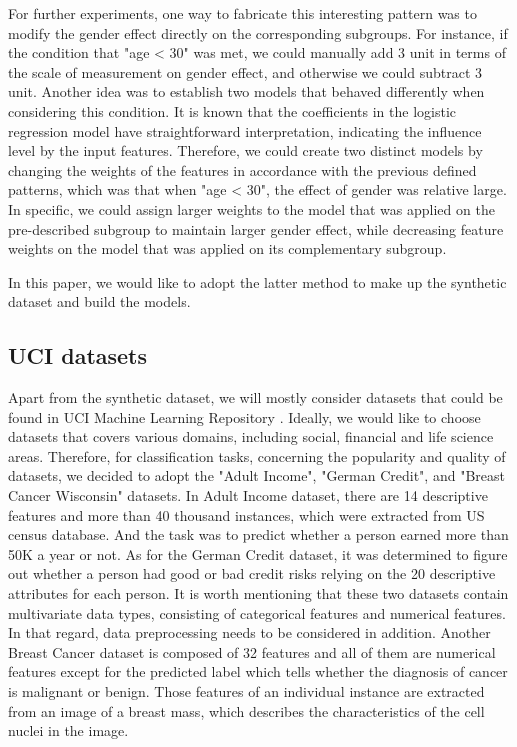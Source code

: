 For further experiments, one way to fabricate this interesting pattern was to modify the gender effect directly on the corresponding subgroups. For instance, if the condition that "age < 30" was met, we could manually add 3 unit in terms of the scale of measurement on gender effect, and otherwise we could subtract 3 unit. Another idea was to establish two models that behaved differently when considering this condition. It is known that the coefficients in the logistic regression model have straightforward interpretation, indicating the influence level by the input features. Therefore, we could create two distinct models by changing the weights of the features in accordance with the previous defined patterns, which was that when "age < 30", the effect of gender was relative large. In specific, we could assign larger weights to the model that was applied on the pre-described subgroup to maintain larger gender effect, while decreasing feature weights on the model that was applied on its complementary subgroup.

In this paper, we would like to adopt the latter method to make up the synthetic dataset and build the models. 

\subsection{UCI datasets}

Apart from the synthetic dataset, we will mostly consider datasets that could be found in UCI Machine Learning Repository \cite{asuncion2007uci}. Ideally, we would like to choose datasets that covers various domains, including social, financial and life science areas. Therefore, for classification tasks, concerning the popularity and quality of datasets, we decided to adopt the "Adult Income", "German Credit", and "Breast Cancer Wisconsin" datasets. In Adult Income dataset, there are 14 descriptive features and more than 40 thousand instances, which were extracted from US census database. And the task was to predict whether a person earned more than 50K a year or not. As for the German Credit dataset, it was determined to figure out whether a person had good or bad credit risks relying on the 20 descriptive attributes for each person. It is worth mentioning that these two datasets contain multivariate data types, consisting of categorical features and numerical features. In that regard, data preprocessing needs to be considered in addition. Another Breast Cancer dataset is composed of 32 features and all of them are numerical features except for the predicted label which tells whether the diagnosis of cancer is malignant or benign. Those features of an individual instance are extracted from an image of a breast mass, which describes the characteristics of the cell nuclei in the image. 


